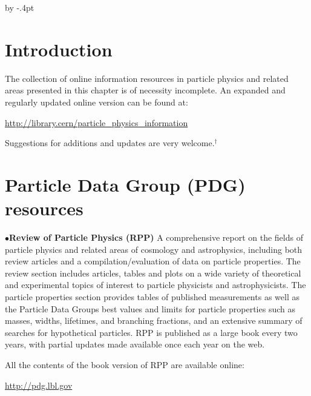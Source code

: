 %
\itemindent=10pt

\advance\baselineskip by -.4pt


\parindent=0pt


\def\UrlBreaks{\do\-\do\.\do\@\do\\\do\/\do\!\do\_\do\|\do\;\do\>\do\]%
 \do\)\do\,\do\?\do\&\do\'\do+\do\=\do\#}%

\section{Introduction}%

The collection of online information resources in particle physics and related areas
presented in this chapter is of necessity incomplete. An expanded and regularly updated
online version can be found at:

		\item{} \url{http://library.cern/particle_physics_information}

Suggestions for additions and updates are very welcome.$^\dagger$

\vglue -0.1in
\section{Particle Data Group (PDG) resources}%

\item{$\bullet$}{\bf Review of Particle Physics (RPP)}
A comprehensive report on the fields of particle physics and related areas of cosmology and astrophysics, including both review articles and a compilation/evaluation of data on particle properties. The review section includes articles, tables and plots on a wide variety of theoretical and experimental topics of interest to particle physicists and astrophysicists. The particle properties section provides tables of published measurements as well as the Particle Data Groups best values and limits for particle properties such as masses, widths, lifetimes, and branching fractions, and an extensive summary of searches for hypothetical particles. RPP is published as a large book every two years, with partial updates made available once each year on the web.

\item{} All the contents of the book version of RPP are available online:

         \item{}\quad\url{http://pdg.lbl.gov}

